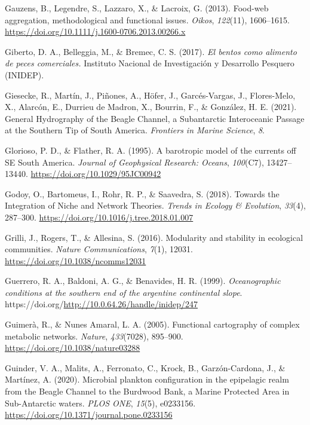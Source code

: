 \documentclass[preprint, 3p,
authoryear]{elsarticle} %
\newlength{\cslhangindent}
\newlength{\cslentryspacingunit} %
\newenvironment{CSLReferences}[2] %
 {%
  \setlength{\parindent}{0pt}
  \ifodd #1
  \let\oldpar\par
  \def\par{\hangindent=\cslhangindent\oldpar}
  \fi
  \setlength{\parskip}{#2\cslentryspacingunit}
 }%
 {}
\begin{document}
\begin{CSLReferences}{1}{0}
\leavevmode{}%
Gauzens, B., Legendre, S., Lazzaro, X., \& Lacroix, G. (2013). Food-web
aggregation, methodological and functional issues. \emph{Oikos},
\emph{122}(11), 1606--1615.
\url{https://doi.org/10.1111/j.1600-0706.2013.00266.x}

\leavevmode{}%
Giberto, D. A., Belleggia, M., \& Bremec, C. S. (2017). \emph{El bentos
como alimento de peces comerciales.} {Instituto Nacional de
Investigación y Desarrollo Pesquero (INIDEP)}.

\leavevmode{}%
Giesecke, R., Martín, J., Piñones, A., Höfer, J., Garcés-Vargas, J.,
Flores-Melo, X., Alarcón, E., Durrieu de Madron, X., Bourrin, F., \&
González, H. E. (2021). General {Hydrography} of the {Beagle Channel}, a
{Subantarctic Interoceanic Passage} at the {Southern Tip} of {South
America}. \emph{Frontiers in Marine Science}, \emph{8}.

\leavevmode{}%
Glorioso, P. D., \& Flather, R. A. (1995). A barotropic model of the
currents off {SE South America}. \emph{Journal of Geophysical Research:
Oceans}, \emph{100}(C7), 13427--13440.
\url{https://doi.org/10.1029/95JC00942}

\leavevmode{}%
Godoy, O., Bartomeus, I., Rohr, R. P., \& Saavedra, S. (2018). Towards
the {Integration} of {Niche} and {Network Theories}. \emph{Trends in
Ecology \& Evolution}, \emph{33}(4), 287--300.
\url{https://doi.org/10.1016/j.tree.2018.01.007}

\leavevmode{}%
Grilli, J., Rogers, T., \& Allesina, S. (2016). Modularity and stability
in ecological communities. \emph{Nature Communications}, \emph{7}(1),
12031. \url{https://doi.org/10.1038/ncomms12031}

\leavevmode{}%
Guerrero, R. A., Baldoni, A. G., \& Benavides, H. R. (1999).
\emph{Oceanographic conditions at the southern end of the argentine
continental slope}.
https://doi.org/\url{http://10.0.64.26/handle/inidep/247}

\leavevmode{}%
Guimerà, R., \& Nunes Amaral, L. A. (2005). Functional cartography of
complex metabolic networks. \emph{Nature}, \emph{433}(7028), 895--900.
\url{https://doi.org/10.1038/nature03288}

\leavevmode{}%
Guinder, V. A., Malits, A., Ferronato, C., Krock, B., Garzón-Cardona,
J., \& Martínez, A. (2020). Microbial plankton configuration in the
epipelagic realm from the {Beagle Channel} to the {Burdwood Bank}, a
{Marine Protected Area} in {Sub-Antarctic} waters. \emph{PLOS ONE},
\emph{15}(5), e0233156.
\url{https://doi.org/10.1371/journal.pone.0233156}


\end{CSLReferences}
\end{document}
